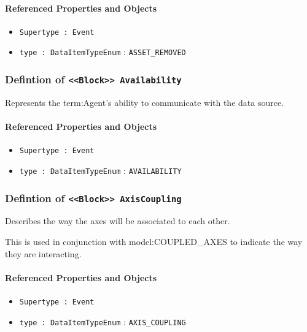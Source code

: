 \FloatBarrier
\paragraph{Referenced Properties and Objects}

\begin{itemize}
\item \texttt{Supertype : Event}

\item \texttt{type : DataItemTypeEnum} : \texttt{ASSET_REMOVED}

\end{itemize}
\FloatBarrier
\subsubsection{Defintion of \texttt{<<Block>> Availability}}
  \label{type:Availability}

\FloatBarrier

Represents the {term:Agent}'s ability to communicate with the data source.

\FloatBarrier
\paragraph{Referenced Properties and Objects}

\begin{itemize}
\item \texttt{Supertype : Event}

\item \texttt{type : DataItemTypeEnum} : \texttt{AVAILABILITY}

\end{itemize}
\FloatBarrier
\subsubsection{Defintion of \texttt{<<Block>> AxisCoupling}}
  \label{type:AxisCoupling}

\FloatBarrier

Describes the way the axes will be associated to each other. 
  
 This is used in conjunction with {model:COUPLED_AXES} to indicate the way they are interacting.

\FloatBarrier
\paragraph{Referenced Properties and Objects}

\begin{itemize}
\item \texttt{Supertype : Event}

\item \texttt{type : DataItemTypeEnum} : \texttt{AXIS_COUPLING}

\end{itemize}
\FloatBarrier
